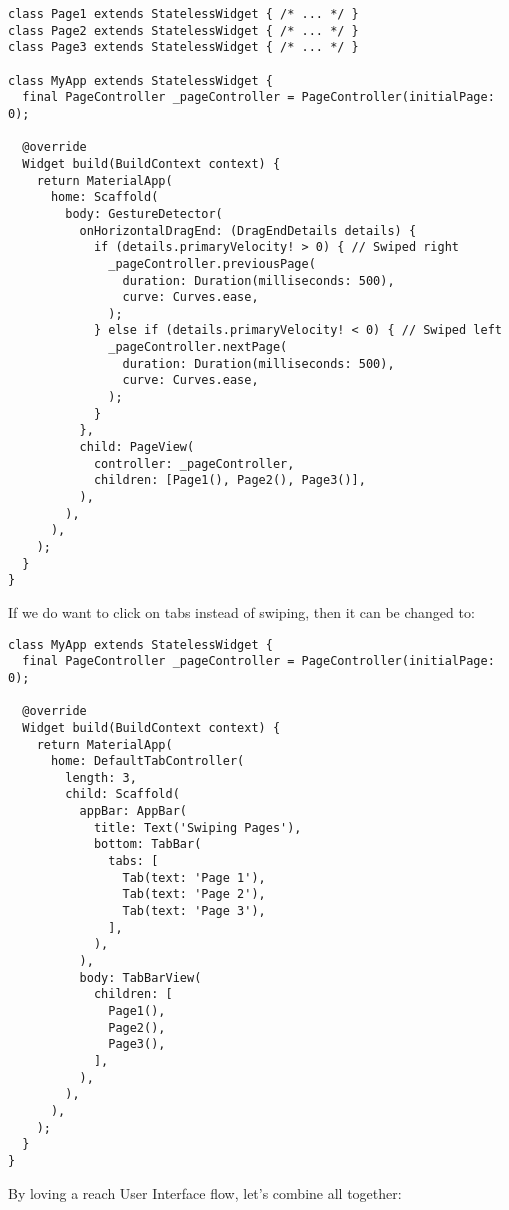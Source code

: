 \begin{lstlisting}
class Page1 extends StatelessWidget { /* ... */ }
class Page2 extends StatelessWidget { /* ... */ }
class Page3 extends StatelessWidget { /* ... */ }

class MyApp extends StatelessWidget {
  final PageController _pageController = PageController(initialPage: 0);

  @override
  Widget build(BuildContext context) {
    return MaterialApp(
      home: Scaffold(
        body: GestureDetector(
          onHorizontalDragEnd: (DragEndDetails details) {
            if (details.primaryVelocity! > 0) { // Swiped right
              _pageController.previousPage(
                duration: Duration(milliseconds: 500),
                curve: Curves.ease,
              );
            } else if (details.primaryVelocity! < 0) { // Swiped left
              _pageController.nextPage(
                duration: Duration(milliseconds: 500),
                curve: Curves.ease,
              );
            }
          },
          child: PageView(
            controller: _pageController,
            children: [Page1(), Page2(), Page3()],
          ),
        ),
      ),
    );
  }
}
\end{lstlisting}

If we do want to click on tabs instead of swiping, then it can be changed to:

\begin{lstlisting}
class MyApp extends StatelessWidget {
  final PageController _pageController = PageController(initialPage: 0);

  @override
  Widget build(BuildContext context) {
    return MaterialApp(
      home: DefaultTabController(
        length: 3,
        child: Scaffold(
          appBar: AppBar(
            title: Text('Swiping Pages'),
            bottom: TabBar(
              tabs: [
                Tab(text: 'Page 1'),
                Tab(text: 'Page 2'),
                Tab(text: 'Page 3'),
              ],
            ),
          ),
          body: TabBarView(
            children: [
              Page1(),
              Page2(),
              Page3(),
            ],
          ),
        ),
      ),
    );
  }
}
\end{lstlisting}

By loving a reach User Interface flow, let's combine all together:

